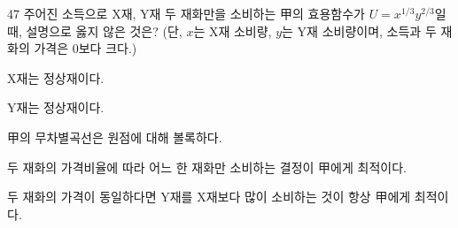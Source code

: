 \begin{question}{47}
주어진 소득으로 X재, Y재 두 재화만을 소비하는 甲의 효용함수가 $U=x^{1/3}y^{2/3}$일 때, 설명으로 옳지 않은 것은? (단, $x$는 X재 소비량, $y$는 Y재 소비량이며, 소득과 두 재화의 가격은 0보다 크다.)
\begin{choices}
  \item X재는 정상재이다.
  \item Y재는 정상재이다.
  \item 甲의 무차별곡선은 원점에 대해 볼록하다.
  \item 두 재화의 가격비율에 따라 어느 한 재화만 소비하는 결정이 甲에게 최적이다.
  \item 두 재화의 가격이 동일하다면 Y재를 X재보다 많이 소비하는 것이 항상 甲에게 최적이다.
\end{choices}
\end{question}
